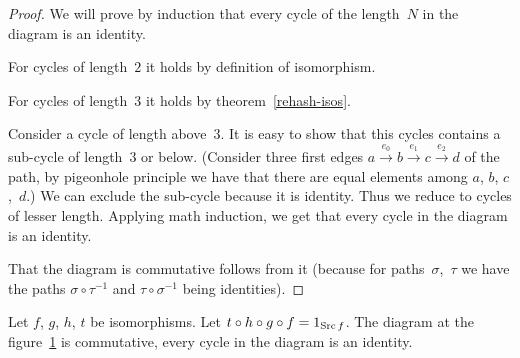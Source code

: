 \begin{proof}
We will prove by induction that every cycle of the length~$N$ in
the diagram is an identity.

For cycles of length~$2$ it holds by definition of isomorphism.

For cycles of length~$3$ it holds by theorem~\ref{rehash-isos}.

Consider a cycle of length above~$3$. It is easy to show that this
cycles contains a sub-cycle of length~$3$ or below. (Consider three
first edges $a\overset{e_{0}}{\rightarrow}b\overset{e_{1}}{\rightarrow}c\overset{e_{2}}{\rightarrow}d$
of the path, by pigeonhole principle we have that there are equal
elements among $a$, $b$, $c$,~$d$.) We can exclude the sub-cycle
because it is identity. Thus we reduce to cycles of lesser length.
Applying math induction, we get that every cycle in the diagram is
an identity.

That the diagram is commutative follows from it (because for paths~$\sigma$,~$\tau$
we have the paths $\sigma\circ\tau^{-1}$ and $\tau\circ\sigma^{-1}$
being identities).\end{proof}
\begin{lem}
\label{four-loop-lem}Let $f$, $g$, $h$, $t$ be isomorphisms.
Let $t\circ h\circ g\circ f=1_{\operatorname{Src} f}$. The diagram at the figure~\ref{four-loop}
is commutative, every cycle in the diagram is an identity.

\begin{figure}[ht]
\caption{\label{four-loop}}


\end{figure}
\end{lem}

